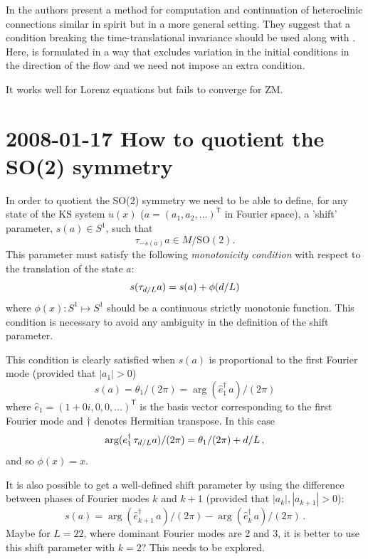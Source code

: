 In  the authors present a
method for computation and continuation of heteroclinic
connections similar in spirit but in a more general setting.
They suggest that a condition breaking the time-translational
invariance should be used along with .
Here,  is formulated in a way that
excludes variation in the initial conditions in the direction
of the flow and we need not impose an extra condition.

It works well for Lorenz equations but fails to converge for ZM.



\section{2008-01-17 How to quotient the SO(2) symmetry}

\medskip{}
In order to quotient the SO(2) symmetry we need to be able to define,
for any state of the KS system $u(x)$
($a = (a_1, a_2, \ldots)^\mathsf{T}$ in Fourier space),
a 'shift' parameter, $s(a) \in S^1 $, such that
\[ \tau_{-s(a)} a \in M/\mathrm{SO}(2). \]
This parameter must satisfy the following {\em monotonicity condition} with
respect to the translation of the state $a$:
\[ s(\tau_{d/L}a) = s(a) + \phi(d/L) \]
where $\phi(x): S^1 \mapsto S^1$ should be a continuous strictly monotonic function.
This condition is necessary to avoid any ambiguity in the definition of
the shift parameter.

This condition is clearly satisfied when $s(a)$ is proportional to
the first Fourier mode (provided that $|a_1| > 0$)
\begin{equation}
  s(a) =  \theta_1/(2\pi) = \arg(\hat{e}_1^\dagger\,a)/(2\pi)
\label{eq:shift1} \end{equation}
where $\hat{e}_1 = (1+0i, 0, 0, \ldots)^\mathsf{T}$ is the basis vector corresponding
to the first Fourier mode and $\dagger$ denotes Hermitian transpose.
In this case
\[ \arg (e_1^\dagger\,\tau_{d/L}a)/(2\pi) = \theta_1/(2\pi) + d/L\,, \]
and so $\phi(x) = x$.

It is also possible to get a well-defined shift parameter by
using the difference between phases of Fourier modes $k$ and $k+1$ (provided
that $|a_k|, |a_{k+1}| > 0$):
\begin{equation}
  s(a) = \arg(\hat{e}_{k+1}^\dagger\,a)/(2\pi) -
  \arg(\hat{e}_{k}^\dagger\,a)/(2\pi)\,.
  \label{eq:shiftk} \end{equation}
Maybe for $L = 22$, where dominant Fourier modes are 2 and 3, it is better to use
this shift parameter with $k = 2$?  This needs to be explored.

